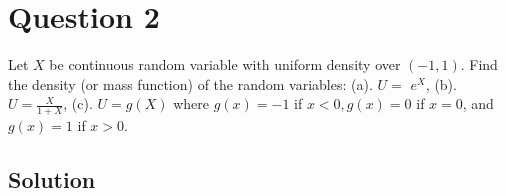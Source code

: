 \section*{Question 2}

Let \( X \) be continuous random variable with uniform density over \( (-1,1) \).
Find the density (or mass function) of the random variables:
(a). \( U= \) \( e^{X} \),
(b). \( U=\frac{X}{1+X} \),
(c). \( U=g(X) \) where \( g(x)=-1 \) if \( x<0, g(x)=0 \) if \( x=0 \), and \( g(x)=1 \) if \( x>0 \).

\subsection*{Solution}
